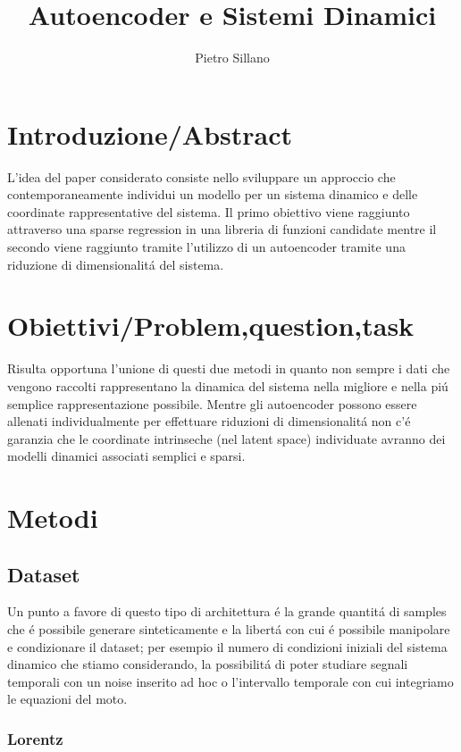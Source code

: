 \documentclass[11pt]{article}
\title{Autoencoder e Sistemi Dinamici}
\author{Pietro Sillano}
\begin{document}
\maketitle
\nocite{1} 



\section{Introduzione/Abstract}
L'idea del paper considerato consiste nello sviluppare un approccio che contemporaneamente individui un modello per un sistema dinamico e delle coordinate rappresentative del sistema.
Il primo obiettivo viene raggiunto attraverso una sparse regression in una libreria di funzioni candidate mentre il secondo viene raggiunto tramite l'utilizzo di un autoencoder tramite una riduzione di dimensionalitá del sistema.
\section{Obiettivi/Problem,question,task}
Risulta opportuna l'unione di questi due metodi in quanto non sempre i dati che vengono raccolti rappresentano la dinamica del sistema nella migliore e nella piú semplice rappresentazione possibile. 
Mentre gli autoencoder possono essere allenati individualmente per effettuare riduzioni di dimensionalitá non c'é garanzia che le coordinate intrinseche (nel latent space) individuate avranno dei modelli dinamici associati semplici e sparsi.


\section{Metodi}

\subsection{Dataset}
Un punto a favore di questo tipo di architettura é la grande quantitá di samples che é possibile generare sinteticamente e la libertá con cui é possibile manipolare e condizionare il dataset; per esempio il numero di condizioni iniziali del sistema dinamico che stiamo considerando, la possibilitá di poter studiare segnali temporali con un noise inserito ad hoc o l'intervallo temporale con cui integriamo le equazioni del moto.

\subsubsection{Lorentz}
\end{document}
